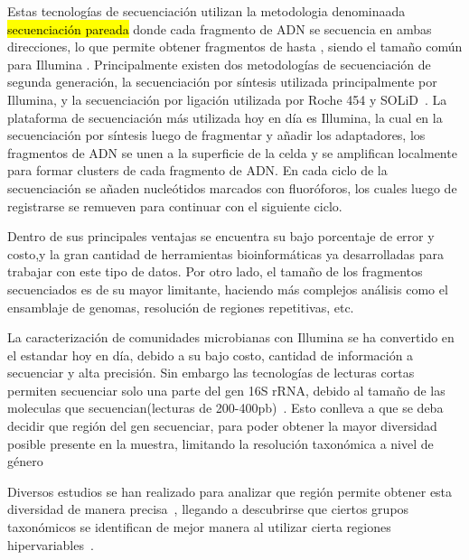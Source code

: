 Estas tecnologías de secuenciación utilizan la metodologia denominaada \hl{secuenciación pareada} donde cada fragmento de ADN se secuencia en ambas direcciones, lo que permite obtener fragmentos de hasta \hl{}, siendo el tamaño común para Illumina \hl{}.
Principalmente existen dos metodologías de secuenciación de segunda generación, la secuenciación por síntesis utilizada principalmente por Illumina, y la secuenciación por ligación utilizada por Roche 454 y SOLiD~\cite{mardis2008next}.
La plataforma de secuenciación más utilizada hoy en día es Illumina, la cual en la secuenciación por síntesis luego de fragmentar y añadir los adaptadores, los fragmentos de ADN se unen a la superficie de la celda y se amplifican localmente para formar clusters de cada fragmento de ADN. En cada ciclo de la secuenciación se añaden nucleótidos marcados con fluoróforos, los cuales luego de registrarse se remueven para continuar con el siguiente ciclo. 


Dentro de sus principales ventajas se encuentra su bajo porcentaje de error y costo,y la gran cantidad de herramientas bioinformáticas ya desarrolladas para trabajar con este tipo de datos. Por otro lado, el tamaño de los fragmentos secuenciados es  de su mayor limitante, haciendo más complejos análisis como el ensamblaje de genomas, resolución de regiones repetitivas, etc.



La caracterización de comunidades microbianas con Illumina se ha convertido en el estandar hoy en día, debido a su bajo costo, cantidad de información a secuenciar y alta precisión. Sin embargo las tecnologías de lecturas cortas permiten secuenciar solo una parte del gen 16S rRNA, debido al tamaño de las moleculas que secuencian(lecturas de 200-400pb)~\cite{salipante2014performance}. Esto conlleva a que se deba decidir que región del gen secuenciar, para poder obtener la mayor diversidad posible presente en la muestra, limitando la resolución taxonómica a nivel de género~\cite{buscar} 


Diversos estudios se han realizado para analizar que región permite obtener esta diversidad de manera precisa~\cite{liu2008accurate,schloss2011reducing}, llegando a descubrirse que ciertos grupos taxonómicos se identifican de mejor manera al utilizar cierta regiones hipervariables~\cite{he2013comparison,claesson2010comparison}.

